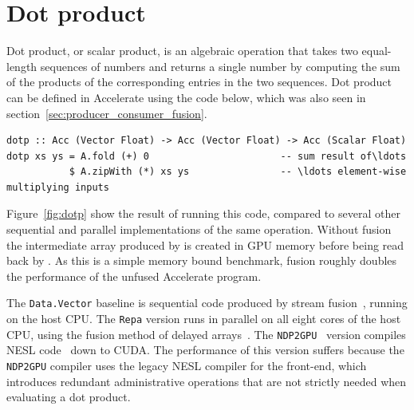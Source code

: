 \section{Dot product}

Dot product, or scalar product, is an algebraic operation that takes two
equal-length sequences of numbers and returns a single number by computing the
sum of the products of the corresponding entries in the two sequences. Dot
product can be defined in Accelerate using the code below, which was also seen
in section~\ref{sec:producer_consumer_fusion}.
%
\begin{lstlisting}[style=haskell
    ,label=lst:dotp
    ,caption={Vector dot-product in Accelerate}]
dotp :: Acc (Vector Float) -> Acc (Vector Float) -> Acc (Scalar Float)
dotp xs ys = A.fold (+) 0                       -- sum result of\ldots
           $ A.zipWith (*) xs ys                -- \ldots element-wise multiplying inputs
\end{lstlisting}
%
Figure~\ref{fig:dotp} show the result of running this code, compared to several
other sequential and parallel implementations of the same operation. Without
fusion the intermediate array produced by  is created in GPU
memory before being read back by . As this is a simple memory bound
benchmark, fusion roughly doubles the performance of the unfused Accelerate
program.

The \texttt{Data.Vector} baseline is sequential code produced by
stream fusion~\cite{Coutts:2007kp}, running on the host
CPU. The \texttt{Repa} version runs in parallel on all eight cores of the host
CPU, using the fusion method of delayed
arrays~\cite{Keller:2010er}. The \texttt{NDP2GPU}~\cite{Bergstrom:2012bi}
version compiles NESL code~\cite{Blelloch:1995ut} down to CUDA. The performance
of this version suffers because the \texttt{NDP2GPU} compiler uses the legacy
NESL compiler for the front-end, which introduces redundant administrative
operations that are not strictly needed when evaluating a dot product.

